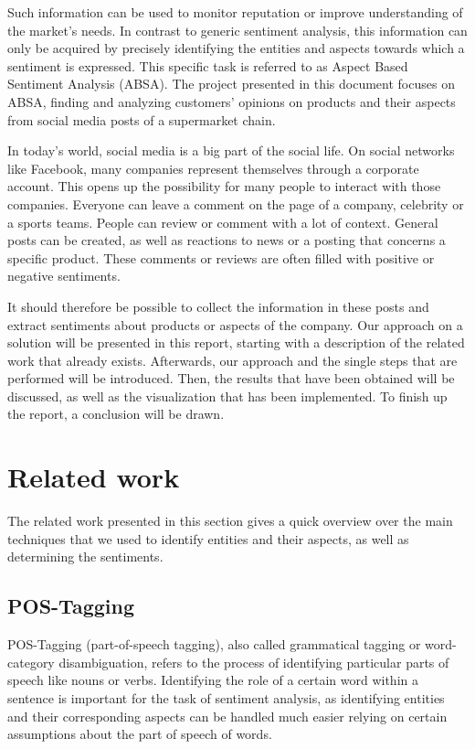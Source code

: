 \documentclass[10pt,a4paper]{article}
\begin{document}
	Such information can be used to monitor reputation or improve understanding of the market's needs. In contrast to generic sentiment analysis, this information can only be acquired by precisely identifying the entities and aspects towards which a sentiment is expressed. This specific task is referred to as Aspect Based Sentiment Analysis (ABSA). The project presented in this document focuses on ABSA, finding and analyzing customers' opinions on products and their aspects from social media posts of a supermarket chain.
	
	In today's world, social media is a big part of the social life. On social networks like Facebook, many companies represent themselves through a corporate account. This opens up the possibility for many people to interact with those companies. Everyone can leave a comment on the page of a company, celebrity or a sports teams. People can review or comment with a lot of context. General posts can be created, as well as reactions to news or a posting that concerns a specific product. These comments or reviews are often filled with positive or negative sentiments. 
	 
	It should therefore be possible to collect the information in these posts and extract sentiments about products or aspects of the company. Our approach on a solution will be presented in this report, starting with a description of the related work that already exists. Afterwards, our approach and the single steps that are performed will be introduced. Then, the results that have been obtained will be discussed, as well as the visualization that has been implemented. To finish up the report, a conclusion will be drawn.
		
	\section{Related work}
	The related work presented in this section gives a quick overview over the main techniques that we used to identify entities and their aspects, as well as determining the sentiments.
		
		\subsection{POS-Tagging}		
		POS-Tagging (part-of-speech tagging), also called grammatical tagging or word-category disambiguation, refers to the process of identifying particular parts of speech like nouns or verbs. Identifying the role of a certain word within a sentence is important for the task of sentiment analysis, as identifying entities and their corresponding aspects can be handled much easier relying on certain assumptions about the part of speech of words.
		
\end{document}
